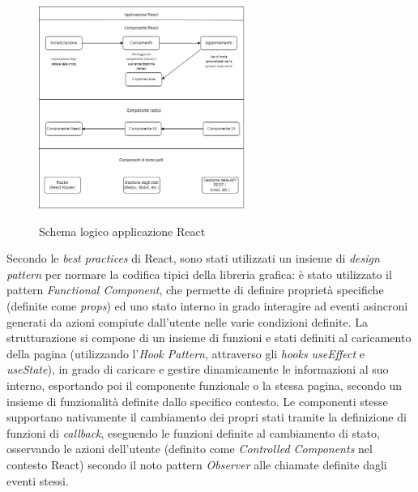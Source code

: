 \begin{figure}[h]
    \centering
    \includegraphics[width=0.6\textwidth, alt={Descrizione dello schema logico di un'applicazione React}]{immagini/react.jpeg}
    \caption{Schema logico applicazione React} \label{fig:react}
\end{figure}


Secondo le \textit{best practices} di React, sono stati utilizzati un insieme di \textit{design pattern} per normare la codifica tipici della libreria grafica:
è stato utilizzato il pattern \textit{Functional Component}, che permette di definire proprietà specifiche (definite come \textit{props})
ed uno stato interno in grado interagire ad eventi asincroni generati da azioni compiute dall'utente nelle varie condizioni definite. La strutturazione si compone di un insieme di funzioni e stati definiti
al caricamento della pagina (utilizzando l'\textit{Hook Pattern}, attraverso gli \textit{hooks} \textit{useEffect} e \textit{useState}), in grado di caricare e gestire dinamicamente le informazioni
al suo interno, esportando poi il componente funzionale o la stessa pagina, secondo un insieme di funzionalità definite dallo specifico contesto. 
Le componenti stesse supportano nativamente il cambiamento dei propri stati tramite la definizione di funzioni di \textit{callback}, eseguendo le funzioni definite al cambiamento di stato,
osservando le azioni dell'utente (definito come \textit{Controlled Components} nel contesto React) secondo il noto pattern \textit{Observer} alle chiamate definite dagli eventi stessi. \\
\\

